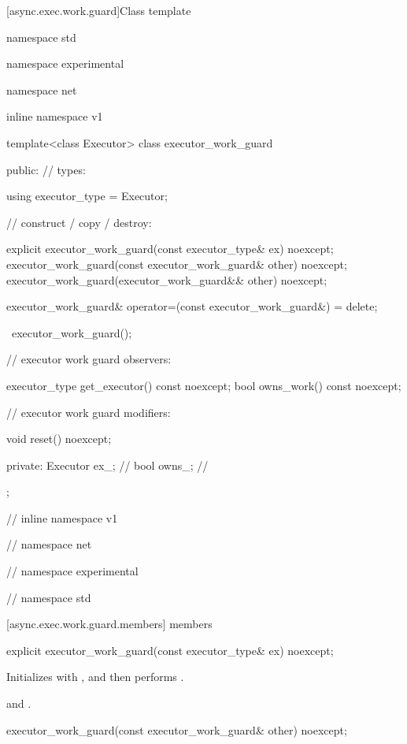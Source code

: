 [async.exec.work.guard]{Class template }

%
\begin{codeblock}
namespace std {
namespace experimental {
namespace net {
inline namespace v1 {

  template<class Executor>
  class executor_work_guard
  {
  public:
    // types:

    using executor_type = Executor;

    // construct / copy / destroy:

    explicit executor_work_guard(const executor_type& ex) noexcept;
    executor_work_guard(const executor_work_guard& other) noexcept;
    executor_work_guard(executor_work_guard&& other) noexcept;

    executor_work_guard& operator=(const executor_work_guard&) = delete;

    ~executor_work_guard();

    // executor work guard observers:

    executor_type get_executor() const noexcept;
    bool owns_work() const noexcept;

    // executor work guard modifiers:

    void reset() noexcept;

  private:
    Executor ex_; // \expos
    bool owns_; // \expos
  };

} // inline namespace v1
} // namespace net
} // namespace experimental
} // namespace std
\end{codeblock}


[async.exec.work.guard.members]{ members}

%
\begin{itemdecl}
explicit executor_work_guard(const executor_type& ex) noexcept;
\end{itemdecl}

\begin{itemdescr}
\pnum
\effects Initializes  with , and then performs .

\pnum
\postconditions {} and .
\end{itemdescr}

%
\begin{itemdecl}
executor_work_guard(const executor_work_guard& other) noexcept;
\end{itemdecl}

